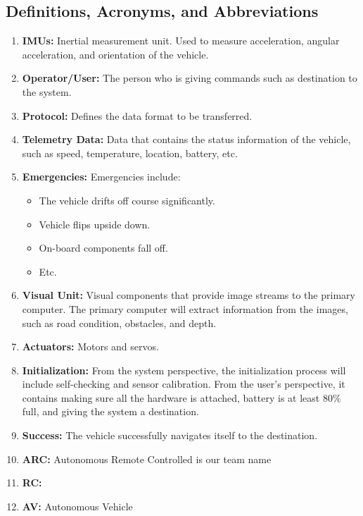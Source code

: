 \documentclass[compsoc,draftclsnofoot,onecolumn,10pt]{IEEEtran}
\begin{document}
\subsection{Definitions, Acronyms, and Abbreviations} %
\begin{enumerate}
	\item \textbf{IMUs:} Inertial measurement unit. Used to measure 
acceleration, angular acceleration, and orientation of the vehicle.
	\item \textbf{Operator/User:} The person who is giving commands 
such as destination to the system.
	\item \textbf{Protocol:} Defines the data format to be 
transferred.
	\item \textbf{Telemetry Data:} Data that contains the status 
information of the vehicle, such as speed, temperature, location, battery, etc.
	\item \textbf{Emergencies:} Emergencies include: 
	\begin{itemize}
		\item The vehicle drifts off course significantly.
		\item Vehicle flips upside down.
		\item On-board components fall off.
		\item Etc.
	\end{itemize}
	\item \textbf{Visual Unit:} Visual components that provide 
image streams to the primary computer. The primary computer will extract 
information from the images, such as road condition, obstacles, and depth. 
	\item \textbf{Actuators:} Motors and servos.
	\item \textbf{Initialization:} From the system perspective, the initialization
	process will include self-checking and sensor calibration. From the user's 
	perspective, it contains making sure all the hardware is attached, battery is 
	at least 80\% full, and giving the system a destination. 
	\item \textbf{Success:} The vehicle successfully navigates itself to the 
	destination.
	\item \textbf{ARC:} Autonomous Remote Controlled is our team name
	\item \textbf{RC:} 
	\item \textbf{AV:} Autonomous Vehicle
\end{enumerate}
\end{document}
